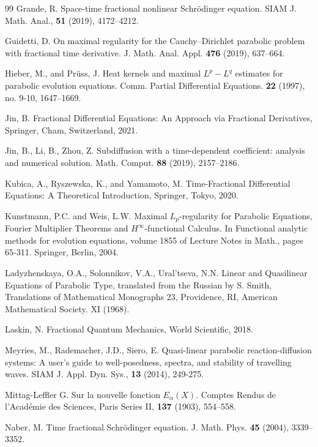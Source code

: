 \documentclass[reqno]{amsart}
\numberwithin{equation}{section}
\begin{document}
\begin{thebibliography}{99}
Grande, R. Space-time fractional nonlinear Schrödinger equation. SIAM J. Math. Anal., \textbf{51} (2019), 4172–4212.

Guidetti, D. On maximal regularity for the Cauchy–Dirichlet parabolic problem with fractional time derivative. J. Math. Anal. Appl. \textbf{476} (2019), 637–664.

Hieber, M., and Prüss, J. Heat kernels and maximal $L^p-L^q$ estimates for parabolic
evolution equations. Comm. Partial Differential Equations. \textbf{22} (1997), no. 9-10, 1647–1669.

Jin, B. Fractional Differential Equations: An Approach via Fractional Derivatives, Springer, Cham, Switzerland, 2021.

Jin, B., Li, B., Zhou, Z. Subdiffusion with a time-dependent coefficient: analysis and numerical solution. Math. Comput. \textbf{88} (2019), 2157–2186.

Kubica, A., Ryszewska, K., and Yamamoto, M. Time-Fractional Differential Equations: A Theoretical Introduction, Springer, Tokyo, 2020.

Kunstmann, P.C. and Weis, L.W. Maximal $L_p$-regularity for Parabolic Equations, Fourier Multiplier Theorems and $H^\infty$-functional Calculus. In Functional analytic methods for evolution equations, volume 1855 of Lecture Notes in Math., pages 65-311. Springer, Berlin, 2004.

Ladyzhenskaya, O.A., Solonnikov, V.A., Ural'tseva, N.N. Linear and Quasilinear Equations of Parabolic Type, translated from the Russian by S. Smith, Translations of Mathematical Monographs 23, Providence, RI, American Mathematical Society. XI (1968).

Laskin, N. Fractional Quantum Mechanics, World Scientific, 2018.

Meyries, M., Rademacher, J.D., Siero, E. Quasi-linear parabolic reaction-diffusion systems: A user's guide to well-posedness, spectra, and stability of travelling waves. SIAM J. Appl. Dyn. Sys., \textbf{13} (2014), 249-275.

Mittag-Leffler G. Sur la nouvelle fonction $E_\alpha(X)$. Comptes Rendus de l'Académie des Sciences, Paris Series II, \textbf{137} (1903), 554–558.

Naber, M. Time fractional Schrödinger equation. J. Math. Phys. \textbf{45} (2004), 3339–3352.


\end{thebibliography}
\end{document}
